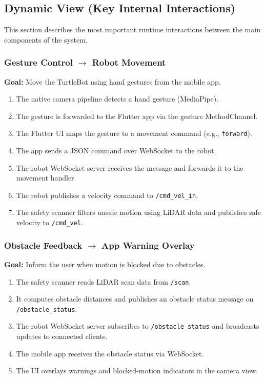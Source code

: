\documentclass[11pt,a4paper]{article}
\begin{document}
\newpage
\subsection{Dynamic View (Key Internal Interactions)}
This section describes the most important runtime interactions between the main components of the system.

\subsubsection{Gesture Control $\rightarrow$ Robot Movement}
\textbf{Goal:} Move the TurtleBot using hand gestures from the mobile app.

\begin{enumerate}[leftmargin=1.5cm]
	\item The native camera pipeline detects a hand gesture (MediaPipe).
	\item The gesture is forwarded to the Flutter app via the gesture MethodChannel.
	\item The Flutter UI maps the gesture to a movement command (e.g., \texttt{forward}).
	\item The app sends a JSON command over WebSocket to the robot.
	\item The robot WebSocket server receives the message and forwards it to the movement handler.
	\item The robot publishes a velocity command to \texttt{/cmd\_vel\_in}.
	\item The safety scanner filters unsafe motion using LiDAR data and publishes safe velocity to \texttt{/cmd\_vel}.
\end{enumerate}

\subsubsection{Obstacle Feedback $\rightarrow$ App Warning Overlay}
\textbf{Goal:} Inform the user when motion is blocked due to obstacles.

\begin{enumerate}[leftmargin=1.5cm]
	\item The safety scanner reads LiDAR scan data from \texttt{/scan}.
	\item It computes obstacle distances and publishes an obstacle status message on \texttt{/obstacle\_status}.
	\item The robot WebSocket server subscribes to \texttt{/obstacle\_status} and broadcasts updates to connected clients.
	\item The mobile app receives the obstacle status via WebSocket.
	\item The UI overlays warnings and blocked-motion indicators in the camera view.
\end{enumerate}
\end{document}

